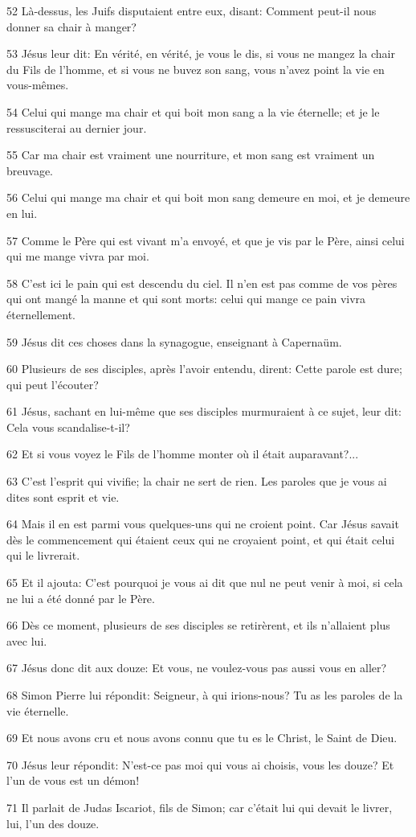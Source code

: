 \par 52 Là-dessus, les Juifs disputaient entre eux, disant: Comment peut-il nous donner sa chair à manger?
\par 53 Jésus leur dit: En vérité, en vérité, je vous le dis, si vous ne mangez la chair du Fils de l'homme, et si vous ne buvez son sang, vous n'avez point la vie en vous-mêmes.
\par 54 Celui qui mange ma chair et qui boit mon sang a la vie éternelle; et je le ressusciterai au dernier jour.
\par 55 Car ma chair est vraiment une nourriture, et mon sang est vraiment un breuvage.
\par 56 Celui qui mange ma chair et qui boit mon sang demeure en moi, et je demeure en lui.
\par 57 Comme le Père qui est vivant m'a envoyé, et que je vis par le Père, ainsi celui qui me mange vivra par moi.
\par 58 C'est ici le pain qui est descendu du ciel. Il n'en est pas comme de vos pères qui ont mangé la manne et qui sont morts: celui qui mange ce pain vivra éternellement.
\par 59 Jésus dit ces choses dans la synagogue, enseignant à Capernaüm.
\par 60 Plusieurs de ses disciples, après l'avoir entendu, dirent: Cette parole est dure; qui peut l'écouter?
\par 61 Jésus, sachant en lui-même que ses disciples murmuraient à ce sujet, leur dit: Cela vous scandalise-t-il?
\par 62 Et si vous voyez le Fils de l'homme monter où il était auparavant?...
\par 63 C'est l'esprit qui vivifie; la chair ne sert de rien. Les paroles que je vous ai dites sont esprit et vie.
\par 64 Mais il en est parmi vous quelques-uns qui ne croient point. Car Jésus savait dès le commencement qui étaient ceux qui ne croyaient point, et qui était celui qui le livrerait.
\par 65 Et il ajouta: C'est pourquoi je vous ai dit que nul ne peut venir à moi, si cela ne lui a été donné par le Père.
\par 66 Dès ce moment, plusieurs de ses disciples se retirèrent, et ils n'allaient plus avec lui.
\par 67 Jésus donc dit aux douze: Et vous, ne voulez-vous pas aussi vous en aller?
\par 68 Simon Pierre lui répondit: Seigneur, à qui irions-nous? Tu as les paroles de la vie éternelle.
\par 69 Et nous avons cru et nous avons connu que tu es le Christ, le Saint de Dieu.
\par 70 Jésus leur répondit: N'est-ce pas moi qui vous ai choisis, vous les douze? Et l'un de vous est un démon!
\par 71 Il parlait de Judas Iscariot, fils de Simon; car c'était lui qui devait le livrer, lui, l'un des douze.

